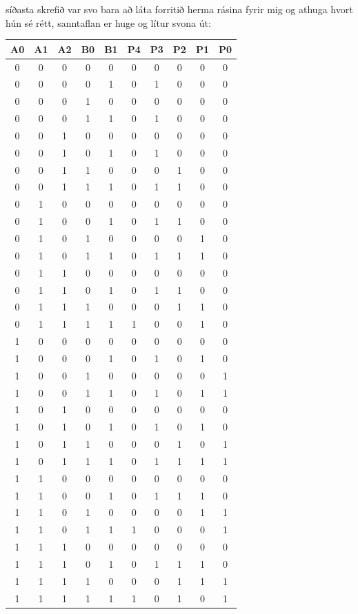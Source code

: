 \documentclass{article}
\begin{document}
\newpage
síðasta skrefið var svo bara að láta forritið herma rásina fyrir mig og athuga hvort hún sé rétt, sanntaflan er huge og lítur svona út:
\begin{center}
    \begin{tabular}{|c|c|c|c|c|c|c|c|c|c|}
        \hline
        A0&A1&A2&B0&B1&P4&P3&P2&P1&P0\\
        \hline
        0&0&0&0&0&0&0&0&0&0\\
        \hline
        0&0&0&0&1&0&1&0&0&0\\
        \hline
        0&0&0&1&0&0&0&0&0&0\\
        \hline
        0&0&0&1&1&0&1&0&0&0\\
        \hline
        0&0&1&0&0&0&0&0&0&0\\
        \hline
        0&0&1&0&1&0&1&0&0&0\\
        \hline
        0&0&1&1&0&0&0&1&0&0\\
        \hline
        0&0&1&1&1&0&1&1&0&0\\
        \hline
        0&1&0&0&0&0&0&0&0&0\\
        \hline
        0&1&0&0&1&0&1&1&0&0\\
        \hline
        0&1&0&1&0&0&0&0&1&0\\
        \hline
        0&1&0&1&1&0&1&1&1&0\\
        \hline
        0&1&1&0&0&0&0&0&0&0\\
        \hline
        0&1&1&0&1&0&1&1&0&0\\
        \hline
        0&1&1&1&0&0&0&1&1&0\\
        \hline
        0&1&1&1&1&1&0&0&1&0\\
        \hline
        1&0&0&0&0&0&0&0&0&0\\
        \hline
        1&0&0&0&1&0&1&0&1&0\\
        \hline
        1&0&0&1&0&0&0&0&0&1\\
        \hline
        1&0&0&1&1&0&1&0&1&1\\
        \hline
        1&0&1&0&0&0&0&0&0&0\\
        \hline
        1&0&1&0&1&0&1&0&1&0\\
        \hline
        1&0&1&1&0&0&0&1&0&1\\
        \hline
        1&0&1&1&1&0&1&1&1&1\\
        \hline
        1&1&0&0&0&0&0&0&0&0\\
        \hline
        1&1&0&0&1&0&1&1&1&0\\
        \hline
        1&1&0&1&0&0&0&0&1&1\\
        \hline
        1&1&0&1&1&1&0&0&0&1\\
        \hline
        1&1&1&0&0&0&0&0&0&0\\
        \hline
        1&1&1&0&1&0&1&1&1&0\\
        \hline
        1&1&1&1&0&0&0&1&1&1\\
        \hline
        1&1&1&1&1&1&0&1&0&1\\
        \hline
    \end{tabular}
\end{center}
\end{document}
